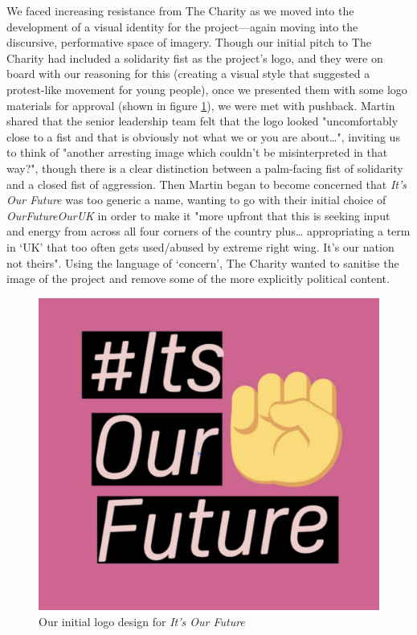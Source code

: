 We faced increasing resistance from The Charity as we moved into the development of a visual identity for the project—again moving into the discursive, performative space of imagery. Though our initial pitch to The Charity had included a solidarity fist as the project's logo, and they were on board with our reasoning for this (creating a visual style that suggested a protest-like movement for young people), once we presented them with some logo materials for approval (shown in figure \ref{fig:iof-logo-1}), we were met with pushback. Martin shared that the senior leadership team felt that the logo looked "uncomfortably close to a fist and that is obviously not what we or you are about…", inviting us to think of "another arresting image which couldn’t be misinterpreted in that way?", though there is a clear distinction between a palm-facing fist of solidarity and a closed fist of aggression. Then Martin began to become concerned that \textit{It’s Our Future }was too generic a name, wanting to go with their initial choice of \textit{OurFutureOurUK} in order to make it "more upfront that this is seeking input and energy from across all four corners of the country plus… appropriating a term in ‘UK’ that too often gets used/abused by extreme right wing. It’s our nation not theirs". Using the language of `concern', The Charity wanted to sanitise the image of the project and remove some of the more explicitly political content.

\begin{figure}[hbt!]
    \centering
    \includegraphics[width=0.25\linewidth]{Images/7/iof-logo-1.png}
    \caption{Our initial logo design for \textit{It's Our Future}}
    \label{fig:iof-logo-1}
\end{figure}

